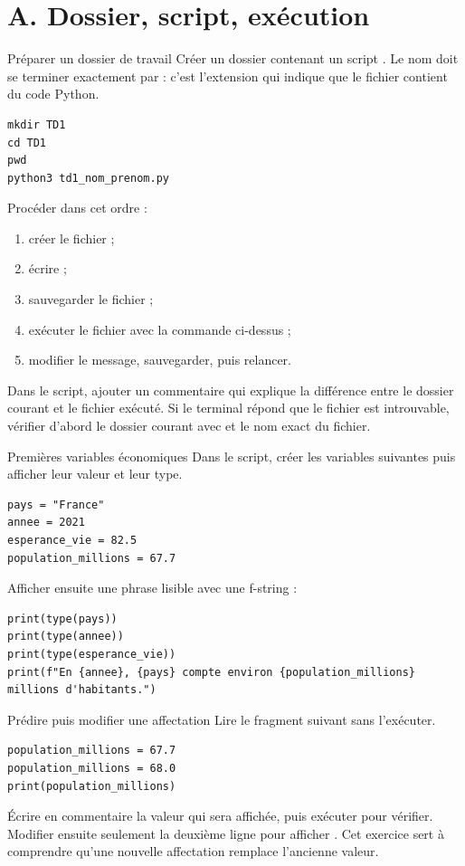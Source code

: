 \documentclass[11pt,a4paper]{article}
\begin{document}
\section*{A. Dossier, script, exécution}

\begin{mandatoryexercise}{Préparer un dossier de travail}
Créer un dossier  contenant un script . Le nom doit se terminer exactement par  : c'est l'extension qui indique que le fichier contient du code Python.
\begin{lstlisting}[language=terminal]
mkdir TD1
cd TD1
pwd
python3 td1_nom_prenom.py
\end{lstlisting}
Procéder dans cet ordre :
\begin{enumerate}
  \item créer le fichier  ;
  \item écrire  ;
  \item sauvegarder le fichier ;
  \item exécuter le fichier avec la commande ci-dessus ;
  \item modifier le message, sauvegarder, puis relancer.
\end{enumerate}
Dans le script, ajouter un commentaire qui explique la différence entre le dossier courant et le fichier exécuté. Si le terminal répond que le fichier est introuvable, vérifier d'abord le dossier courant avec  et le nom exact du fichier.
\end{mandatoryexercise}

\begin{mandatoryexercise}{Premières variables économiques}
Dans le script, créer les variables suivantes puis afficher leur valeur et leur type.
\begin{lstlisting}
pays = "France"
annee = 2021
esperance_vie = 82.5
population_millions = 67.7
\end{lstlisting}
Afficher ensuite une phrase lisible avec une f-string :
\begin{lstlisting}
print(type(pays))
print(type(annee))
print(type(esperance_vie))
print(f"En {annee}, {pays} compte environ {population_millions} millions d'habitants.")
\end{lstlisting}
\end{mandatoryexercise}

\begin{mandatoryexercise}{Prédire puis modifier une affectation}
Lire le fragment suivant sans l'exécuter.
\begin{lstlisting}
population_millions = 67.7
population_millions = 68.0
print(population_millions)
\end{lstlisting}
Écrire en commentaire la valeur qui sera affichée, puis exécuter pour vérifier. Modifier ensuite seulement la deuxième ligne pour afficher . Cet exercice sert à comprendre qu'une nouvelle affectation remplace l'ancienne valeur.
\end{mandatoryexercise}
\end{document}

